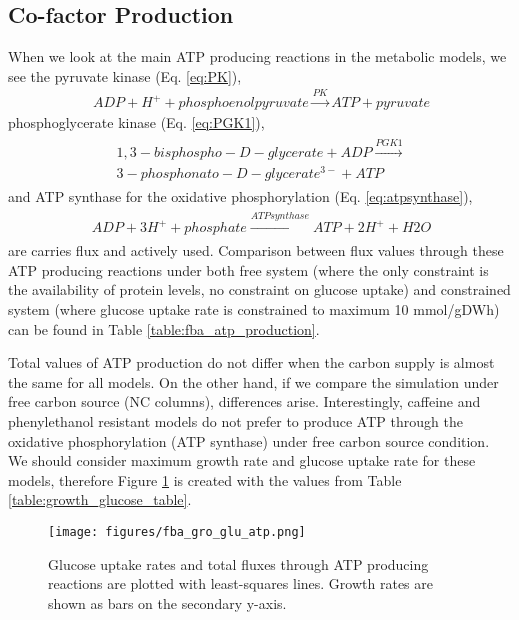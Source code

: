 \subsection{Co-factor Production}
When we look at the main ATP producing reactions in the metabolic models, we see the pyruvate kinase (Eq. \ref{eq:PK}),
\begin{align}
\label{eq:PK}
\ ADP + H^+ + phosphoenolpyruvate \xrightarrow{PK} ATP + pyruvate
\end{align}
phosphoglycerate kinase (Eq. \ref{eq:PGK1}),
\begin{align}
\begin{split}
\label{eq:PGK1}
\ 1,3-bisphospho-D-glycerate + ADP  \xrightarrow{PGK1} \\
\ 3-phosphonato-D-glycerate^{3-} + ATP
\end{split}
\end{align}
and ATP synthase for the oxidative phosphorylation (Eq. \ref{eq:atpsynthase}),
\begin{align}
\begin{split}
\label{eq:atpsynthase}
\ ADP + 3 H^+ + phosphate   \xrightarrow{ATP synthase}  ATP + 2 H^+ + H2O
\end{split}
\end{align}
are carries flux and actively used. Comparison between flux values through these ATP producing reactions under both free system (where the only constraint is the availability of protein levels, no constraint on glucose uptake) and constrained system (where glucose uptake rate is constrained to maximum 10 mmol/gDWh) can be found in Table \ref{table:fba_atp_production}.

\baselineskip


Total values of ATP production do not differ when the carbon supply is almost the same for all models. On the other hand, if we compare the simulation under free carbon source (NC columns), differences arise. Interestingly, caffeine and phenylethanol resistant models do not prefer to produce ATP through the oxidative phosphorylation (ATP synthase) under free carbon source condition. We should consider maximum growth rate and glucose uptake rate for these models, therefore Figure \ref{fig:fba_gro_glu_atp} is created with the values from Table \ref{table:growth_glucose_table}.

\begin{figure}[H]
  \begin{center}
  \texttt{[image: figures/fba\_gro\_glu\_atp.png]}
  \caption[Glucose uptake rates and total fluxes through ATP producing reactions are plotted with least-squares lines. Growth rates are shown as bar graphs.]{Glucose uptake rates and total fluxes through ATP producing reactions are plotted with least-squares lines. Growth rates are shown as bars on the secondary y-axis.}
  \label{fig:fba_gro_glu_atp}
  \end{center}
\end{figure}

